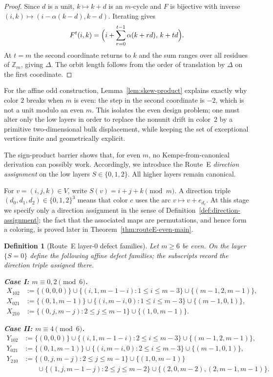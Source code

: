 \documentclass[11pt]{article}
\newtheorem{definition}{Definition}
\begin{document}
\begin{proof}
Since $d$ is a unit, $k\mapsto k+d$ is an $m$-cycle and $F$ is bijective with inverse $(i,k)\mapsto(i-\alpha(k-d),k-d)$.
Iterating gives
\[
F^t(i,k)=\Bigl(i+\sum_{r=0}^{t-1}\alpha(k+rd),\,k+td\Bigr).
\]
At $t=m$ the second coordinate returns to $k$ and the sum ranges over all residues of $\mathbb Z_m$, giving $\Delta$.
The orbit length follows from the order of translation by $\Delta$ on the first coordinate.
\end{proof}

For the affine odd construction, Lemma~\ref{lem:skew-product} explains exactly why color $2$ breaks when $m$ is even: the step in the second coordinate is $-2$, which is not a unit modulo an even $m$.
This isolates the even design problem; one must alter only the low layers in order to replace the nonunit drift in color~$2$ by a primitive two-dimensional bulk displacement, while keeping the set of exceptional vertices finite and geometrically explicit.

The sign-product barrier shows that, for even $m$, no Kempe-from-canonical derivation can possibly work.
Accordingly, we introduce the Route~E \emph{direction assignment} on the low layers $S\in\{0,1,2\}$.
All higher layers remain canonical.

For $v=(i,j,k)\in V$, write $S(v)=i+j+k\pmod m$.
A direction triple $(d_0,d_1,d_2)\in\{0,1,2\}^3$ means that color $c$ uses the arc $v\mapsto v+e_{d_c}$.
At this stage we specify only a direction assignment in the sense of Definition~\ref{def:direction-assignment}; the fact that the associated maps are permutations, and hence form a coloring, is proved later in Theorem~\ref{thm:routeE-even-main}.

\begin{definition}[Route~E layer-$0$ defect families]\label{def:routeE-layer0-families}
Let $m\ge 6$ be even.
On the layer $\{S=0\}$ define the following affine defect families; the subscripts record the direction triple assigned there.

\smallskip
\noindent\textbf{Case I: $m\equiv 0,2\pmod 6$.}
\begin{align*}
X_{102}&:=\{(0,0,0)\}\cup\{(i,1,m-1-i):1\le i\le m-3\}\cup\{(m-1,2,m-1)\},\\
X_{021}&:=\{(0,1,m-1)\}\cup\{(i,m-i,0):1\le i\le m-3\}\cup\{(m-1,0,1)\},\\
X_{210}&:=\{(0,j,m-j):2\le j\le m-1\}\cup\{(1,0,m-1)\}.
\end{align*}

\smallskip
\noindent\textbf{Case II: $m\equiv 4\pmod 6$.}
\begin{align*}
Y_{102}&:=\{(0,0,0)\}\cup\{(i,1,m-1-i):2\le i\le m-3\}\cup\{(m-1,2,m-1)\},\\
Y_{021}&:=\{(0,1,m-1)\}\cup\{(i,m-i,0):2\le i\le m-3\}\cup\{(m-1,0,1)\},\\
Y_{210}&:=\{(0,j,m-j):2\le j\le m-1\}\cup\{(1,0,m-1)\}\\
&\hspace{2em}\cup\{(1,j,m-1-j):2\le j\le m-2\}\cup\{(2,0,m-2),(2,m-1,m-1)\}.
\end{align*}
\end{definition}
\end{document}
